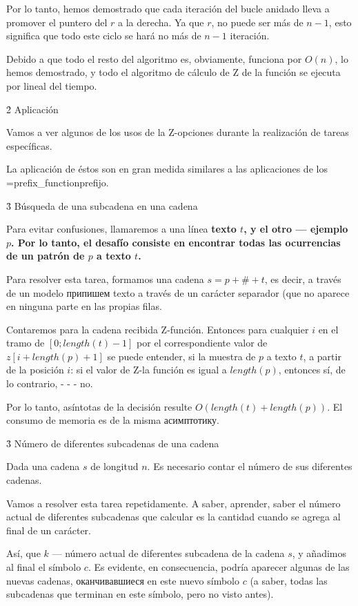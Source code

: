 Por lo tanto, hemos demostrado que cada iteración del bucle anidado lleva a promover el puntero del $r$ a la derecha. Ya que $r$, no puede ser más de $n-1$, esto significa que todo este ciclo se hará no más de $n-1$ iteración.

Debido a que todo el resto del algoritmo es, obviamente, funciona por $O (n)$, lo hemos demostrado, y todo el algoritmo de cálculo de Z de la función se ejecuta por lineal del tiempo.



\h2{ Aplicación }

Vamos a ver algunos de los usos de la Z-opciones durante la realización de tareas específicas.

La aplicación de éstos son en gran medida similares a las aplicaciones de los \algohref=prefix_function{prefijo}.


\h3{ Búsqueda de una subcadena en una cadena }

Para evitar confusiones, llamaremos a una línea \bf{texto} $t$, y el otro --- \bf{ejemplo} $p$. Por lo tanto, el desafío consiste en encontrar todas las ocurrencias de un patrón de $p$ a texto $t$.

Para resolver esta tarea, formamos una cadena $s = p + \# + t$, es decir, a través de un modelo припишем texto a través de un carácter separador (que no aparece en ninguna parte en las propias filas.

Contaremos para la cadena recibida Z-función. Entonces para cualquier $i$ en el tramo de $[0; length(t)-1]$ por el correspondiente valor de $z[i + length(p) + 1]$ se puede entender, si la muestra de $p$ a texto $t$, a partir de la posición $i$: si el valor de Z-la función es igual a $length(p)$, entonces sí, de lo contrario, - - - no.

Por lo tanto, asíntotas de la decisión resulte $O (length(t) + length(p))$. El consumo de memoria es de la misma асимптотику.


\h3{ Número de diferentes subcadenas de una cadena }

Dada una cadena $s$ de longitud $n$. Es necesario contar el número de sus diferentes cadenas.

Vamos a resolver esta tarea repetidamente. A saber, aprender, saber el número actual de diferentes subcadenas que calcular es la cantidad cuando se agrega al final de un carácter.

Así, que $k$ --- número actual de diferentes subcadena de la cadena $s$, y añadimos al final el símbolo $c$. Es evidente, en consecuencia, podría aparecer algunas de las nuevas cadenas, оканчивавшиеся en este nuevo símbolo $c$ (a saber, todas las subcadenas que terminan en este símbolo, pero no visto antes).

